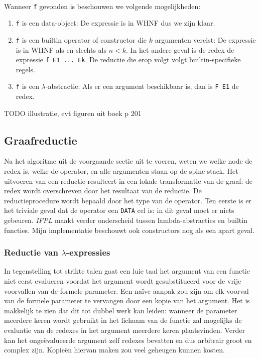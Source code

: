 \documentclass[a4paper,10pt]{article}
\begin{document}
\paragraph{}
Wanneer \texttt{f} gevonden is beschouwen we volgende mogelijkheden:
\begin{enumerate}
\item \texttt{f} is een data-object: De expressie is in WHNF dus we zijn klaar.
\item \texttt{f} is een builtin operator of constructor die $k$ argumenten vereist: De expressie is in WHNF als en slechts als $n < k$. In het andere geval is de redex de expressie \texttt{f E1 ... Ek}. De reductie die erop volgt volgt builtin-specifieke regels.
\item \texttt{f} is een $\lambda$-abstractie: Als er een argument beschikbaar is, dan is \texttt{F E1} de redex.
\end{enumerate}
TODO illustratie, evt figuren uit boek p 201
\paragraph{}

\subsection{Graafreductie}
Na het algoritme uit de voorgaande sectie uit te voeren, weten we welke node de redex is, welke de operator, en alle argumenten staan op de spine stack.
Het uitvoeren van een reductie resulteert in een lokale transformatie van de graaf: de redex wordt overschreven door het resultaat van de reductie.
De reductieprocedure wordt bepaald door het type van de operator.
Ten eerste is er het triviale geval dat de operator een \texttt{DATA} cel is: in dit geval moet er niets gebeuren.
\emph{IFPL} maakt verder onderscheid tussen lambda-abstracties en builtin functies. Mijn implementatie beschouwt ook constructors nog als een apart geval.

\subsubsection{Reductie van $\lambda$-expressies}
In tegenstelling tot strikte talen gaat een luie taal het argument van een functie niet eerst evalueren voordat het argument wordt gesubstitueerd voor de vrije voorvallen van de formele parameter.
Een na{\"i}ve aanpak zou zijn om elk voorval van de formele parameter te vervangen door een kopie van het argument.
Het is makkelijk te zien dat dit tot dubbel werk kan leiden: wanneer de parameter meerdere keren wordt gebruikt in het lichaam van de functie zal mogelijks de evaluatie van de redexes in het argument meerdere keren plaatsvinden.
Verder kan het onge{\"e}valueerde argument zelf redexes bevatten en dus arbitrair groot en complex zijn.
Kopie{\"e}n hiervan maken zou veel geheugen kunnen kosten.
\end{document}
